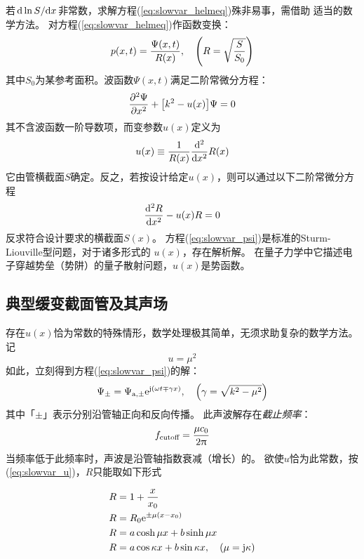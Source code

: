 \documentclass[UTF8]{ctexbook}
\begin{document}
若$\dv*{\ln S}{x}$非常数，求解方程(\ref{eq:slowvar_helmeq})殊非易事，需借助
适当的数学方法。
对方程(\ref{eq:slowvar_helmeq})作函数变换：
\begin{equation}
	\label{eq:slowvar_ppsi}
	p(x,t) = \frac{\Psi(x,t)}{R(x)}\qc \qty(R=\sqrt{\frac{S}{S_0}})
\end{equation}
其中$S_0$为某参考面积。波函数$\Psi(x,t)$满足二阶常微分方程：
\begin{equation}
	\label{eq:slowvar_psi}
	\pdv[2]{\Psi}{x} +\qty[k^2-u(x)]\Psi=0
\end{equation}
其不含波函数一阶导数项，而变参数$u(x)$定义为
\begin{equation}
	\label{eq:slowvar_u}
	u(x) \equiv \frac{1}{R(x)} \dv[2]{x} R(x)
\end{equation}
它由管横截面$S$确定。反之，若按设计给定$u(x)$，则可以通过以下二阶常微分方程
\begin{equation}
	\dv[2]{R}{x} - u(x)R=0
\end{equation}
反求符合设计要求的横截面$S(x)$。
方程(\ref{eq:slowvar_psi})是标准的Sturm-Liouville型问题，对于诸多形式的
$u(x)$，存在解析解。
在量子力学中它描述电子穿越势垒（势阱）的量子散射问题，$u(x)$是势函数。

\subsection{典型缓变截面管及其声场}
存在$u(x)$恰为常数的特殊情形，数学处理极其简单，无须求助复杂的数学方法。
记
$$u=\mu^2$$
如此，立刻得到方程(\ref{eq:slowvar_psi})的解：
\begin{equation}
	\label{eq:slowvar_psipm}
	\Psi_\pm = \Psi_{\mathrm{a},\pm} \me^{\mj(\omega t\mp \gamma x)}
	\qc \qty(\gamma = \sqrt{k^2-\mu^2})
\end{equation}
其中「$\pm$」表示分别沿管轴正向和反向传播。
此声波解存在\emph{截止频率}：
$$
f_\text{cutoff} = \frac{\mu c_0}{2\uppi}
$$
当频率低于此频率时，声波是沿管轴指数衰减（增长）的。
欲使$u$恰为此常数，按(\ref{eq:slowvar_u})，$R$只能取如下形式

\begin{subequations}
	\label{eq:slowvar_R}
	\begin{align}
		R & = 1+\frac{x}{x_0}\\
		R& = R_0 \me^{\pm \mu(x-x_0)} \label{eq:slowvar_Rexp} \\
		R&=a\cosh \mu x +b\sinh \mu x \label{eq:slowvar_Rcat}\\
		R& = a\cos \kappa x + b\sin \kappa x\qc (\mu = \mj \kappa)
	\end{align}
\end{subequations}
\end{document}
